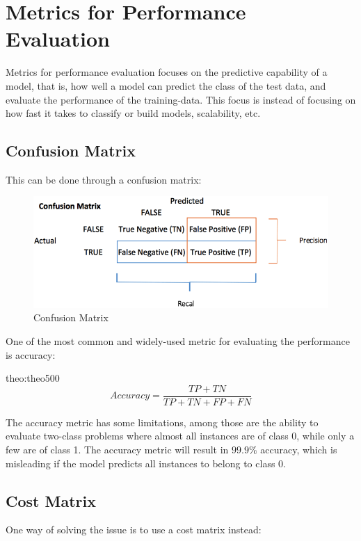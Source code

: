 \section{Metrics for Performance Evaluation}
Metrics for performance evaluation focuses on the predictive capability of a model, that is, how well a model can predict the class of the test data, and evaluate the performance of the training-data.
This focus is instead of focusing on how fast it takes to classify or build models, scalability, etc.

\subsection{Confusion Matrix}
This can be done through a confusion matrix:

\bigskip
\begin{figure}[H]
    \centering
    \includegraphics[scale=0.5]{figures/confusionmatrix.png}
    \caption{Confusion Matrix}
\end{figure}

One of the most common and widely-used metric for evaluating the performance is accuracy:

\begin{theo}[]{theo:theo500}
    \label{eq:accuracy}
        \[
            Accuracy = \frac{TP + TN}{TP + TN + FP + FN}
        \]
\end{theo}

The accuracy metric has some limitations, among those are the ability to evaluate two-class problems where almost all instances are of class 0, while only a few are of class 1.
The accuracy metric will result in $99.9\%$ accuracy, which is misleading if the model predicts all instances to belong to class 0.

\subsection{Cost Matrix}

One way of solving the issue is to use a cost matrix instead:

